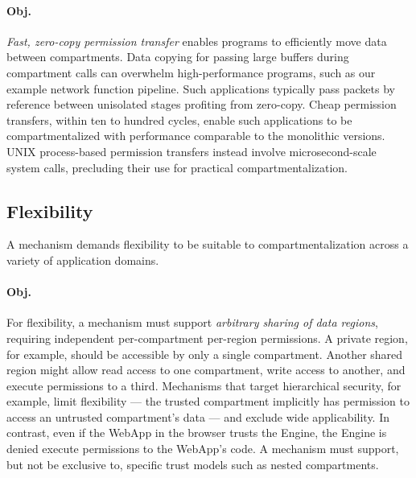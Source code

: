 \paragraph{Obj. }
\emph{Fast, zero-copy permission transfer} enables programs to 
efficiently move data between compartments.
Data copying for passing large buffers during 
compartment calls can overwhelm high-performance programs, 
such as our example network function pipeline.
Such applications typically pass packets by reference between 
unisolated stages profiting from zero-copy.
Cheap permission transfers, within ten to hundred cycles, enable 
such applications to be compartmentalized with performance
comparable to the monolithic versions.
UNIX process-based permission transfers instead involve microsecond-scale
system calls, precluding their use for practical compartmentalization.

\subsection{Flexibility}
\label{sec:seccells:reqs:flexibility}

A mechanism demands flexibility to be suitable
to compartmentalization across a variety of application domains. 

\paragraph{Obj. }
For flexibility, a mechanism must support \emph{arbitrary sharing of data
regions},
requiring independent per-compartment per-region permissions.
A private region, for example, should be accessible by only a single
compartment.
Another shared region might allow read access to one compartment, 
write access to another, and execute permissions to a third.
Mechanisms that target hierarchical security, for example, limit
flexibility --- the trusted  compartment implicitly has permission
to access an untrusted compartment's data --- and exclude wide 
applicability.
In contrast, even if the WebApp in the browser trusts the Engine,
the Engine is denied execute permissions to the WebApp's code.
A mechanism must support, but not be exclusive to, specific trust
models such as nested compartments.

